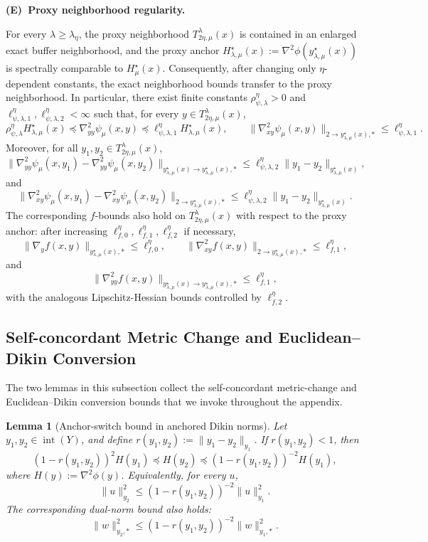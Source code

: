 \documentclass{article}
\newtheorem{lemma}{Lemma}
\newcounter{Eitem}
\renewcommand{\theEitem}{E\arabic{Eitem}}
\newcommand{\Etag}[2]{%
  \refstepcounter{Eitem}%
  \medskip\noindent\textbf{(\theEitem)~#1}\label{#2}%
}
\begin{document}
\Etag{Proxy neighborhood  regularity.}{ex:E4}
For every \(\lambda\ge\lambda_\eta\), the proxy neighborhood
\(T_{2\eta,\mu}^{\lambda}(x)\) is contained in an enlarged exact buffer neighborhood, and the proxy anchor
\(H_{\lambda,\mu}^\star(x):=\nabla^2\phi(y_{\lambda,\mu}^\star(x))\) is spectrally comparable to
\(H_\mu^\star(x)\). Consequently, after changing only \(\eta\)-dependent constants, the exact neighborhood
bounds transfer to the proxy neighborhood. In particular, there exist finite constants
\(\rho_{\psi,\lambda}^{\eta}>0\) and
\(\ell_{\psi,\lambda,1}^{\eta},\ell_{\psi,\lambda,2}^{\eta}<\infty\) such that, for every
\(y\in T_{2\eta,\mu}^{\lambda}(x)\),
\[
\rho_{\psi,\lambda}^{\eta}H_{\lambda,\mu}^\star(x)
\preceq
\nabla_{yy}^2\psi_\mu(x,y)
\preceq
\ell_{\psi,\lambda,1}^{\eta}H_{\lambda,\mu}^\star(x),
\qquad
\|\nabla_{xy}^2\psi_\mu(x,y)\|_{2\to y_{\lambda,\mu}^\star(x),*}
\le
\ell_{\psi,\lambda,1}^{\eta}.
\]
Moreover, for all \(y_1,y_2\in T_{2\eta,\mu}^{\lambda}(x)\),
\[
\|\nabla_{yy}^2\psi_\mu(x,y_1)-\nabla_{yy}^2\psi_\mu(x,y_2)\|_{y_{\lambda,\mu}^\star(x)\to y_{\lambda,\mu}^\star(x),*}
\le
\ell_{\psi,\lambda,2}^{\eta}
\|y_1-y_2\|_{y_{\lambda,\mu}^\star(x)},
\]
and
\[
\|\nabla_{xy}^2\psi_\mu(x,y_1)-\nabla_{xy}^2\psi_\mu(x,y_2)\|_{2\to y_{\lambda,\mu}^\star(x),*}
\le
\ell_{\psi,\lambda,2}^{\eta}
\|y_1-y_2\|_{y_{\lambda,\mu}^\star(x)}.
\]
The corresponding \(f\)-bounds also hold on \(T_{2\eta,\mu}^{\lambda}(x)\) with respect to the proxy
anchor: after increasing
\(\ell_{f,0}^{\eta},\ell_{f,1}^{\eta},\ell_{f,2}^{\eta}\) if necessary,
\[
\|\nabla_y f(x,y)\|_{y_{\lambda,\mu}^\star(x),*}\le \ell_{f,0}^{\eta},\qquad
\|\nabla_{xy}^2 f(x,y)\|_{2\to y_{\lambda,\mu}^\star(x),*}\le \ell_{f,1}^{\eta},
\]
and
\[
\|\nabla_{yy}^2 f(x,y)\|_{y_{\lambda,\mu}^\star(x)\to y_{\lambda,\mu}^\star(x),*}
\le
\ell_{f,1}^{\eta},
\]
with the analogous Lipschitz-Hessian bounds controlled by \(\ell_{f,2}^{\eta}\).

\subsection{Self-concordant Metric Change and Euclidean--Dikin Conversion}

The two lemmas in this subsection collect the self-concordant metric-change and Euclidean–Dikin conversion bounds that we invoke throughout the appendix. 


\begin{lemma}[Anchor-switch bound in anchored Dikin norms]
\label{lem:anchor_switch}
Let \(y_1,y_2\in \operatorname{int}(Y)\), and define
\(r(y_1,y_2):=\|y_1-y_2\|_{y_1}\). If \(r(y_1,y_2)<1\), then
\[
(1-r(y_1,y_2))^2H(y_1)
\preceq
H(y_2)
\preceq
(1-r(y_1,y_2))^{-2}H(y_1),
\]
where \(H(y):=\nabla^2\phi(y)\). Equivalently, for every \(u\),
\[
\|u\|_{y_2}^2
\le
(1-r(y_1,y_2))^{-2}\|u\|_{y_1}^2.
\]
The corresponding dual-norm bound also holds:
\[
\|w\|_{y_2,*}^2
\le
(1-r(y_1,y_2))^{-2}\|w\|_{y_1,*}^2.
\]
\end{lemma}
\end{document}
